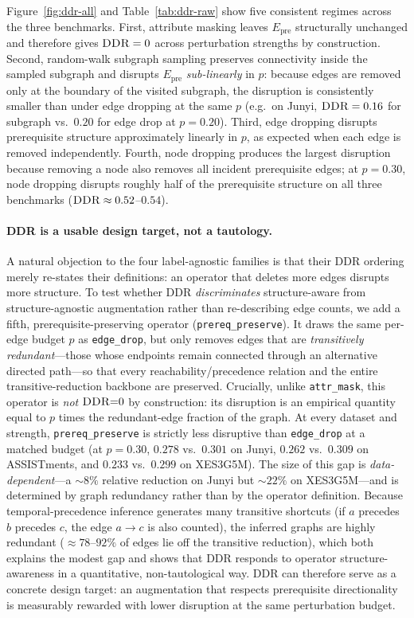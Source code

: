 \documentclass[runningheads]{llncs}
\newcommand{\Epre}{\ensuremath{E_{\text{pre}}}}
\newcommand{\DDR}{\textsc{DDR}}
\begin{document}
Figure~\ref{fig:ddr-all} and Table~\ref{tab:ddr-raw} show five
consistent regimes across the three benchmarks. First, attribute
masking leaves $\Epre$ structurally unchanged and therefore gives
$\DDR{}=0$ across perturbation strengths by construction. Second,
random-walk subgraph sampling preserves connectivity inside the
sampled subgraph and disrupts $\Epre$ \emph{sub-linearly} in $p$:
because edges are removed only at the boundary of the visited
subgraph, the disruption is consistently smaller than under
edge dropping at the same $p$ (e.g.\ on Junyi, $\DDR{} = 0.16$ for
subgraph vs.\ $0.20$ for edge drop at $p=0.20$). Third, edge dropping
disrupts prerequisite structure approximately linearly in $p$, as
expected when each edge is removed independently. Fourth, node
dropping produces the largest disruption because removing a node also
removes all incident prerequisite edges; at $p = 0.30$, node dropping
disrupts roughly half of the prerequisite structure on all three
benchmarks ($\DDR{} \approx 0.52$--$0.54$).

\paragraph{\DDR{} is a usable design target, not a tautology.}
A natural objection to the four label-agnostic families is that their
\DDR{} ordering merely re-states their definitions: an operator that
deletes more edges disrupts more structure. To test whether \DDR{}
\emph{discriminates} structure-aware from structure-agnostic
augmentation rather than re-describing edge counts, we add a fifth,
prerequisite-preserving operator (\texttt{prereq\_preserve}). It draws
the same per-edge budget $p$ as \texttt{edge\_drop}, but only removes
edges that are \emph{transitively redundant}---those whose endpoints
remain connected through an alternative directed path---so that every
reachability/precedence relation and the entire transitive-reduction
backbone are preserved. Crucially, unlike \texttt{attr\_mask}, this
operator is \emph{not} $\DDR{=}0$ by construction: its disruption is an
empirical quantity equal to $p$ times the redundant-edge fraction of the
graph. At every dataset and strength, \texttt{prereq\_preserve} is
strictly less disruptive than \texttt{edge\_drop} at a matched budget
(at $p=0.30$, $0.278$ vs.\ $0.301$ on Junyi, $0.262$ vs.\ $0.309$ on
ASSISTments, and $0.233$ vs.\ $0.299$ on XES3G5M). The size of this gap
is \emph{data-dependent}---a $\sim 8\%$ relative reduction on Junyi but
$\sim 22\%$ on XES3G5M---and is determined by graph redundancy rather
than by the operator definition. Because temporal-precedence inference
generates many transitive shortcuts (if $a$ precedes $b$ precedes $c$,
the edge $a\!\to\!c$ is also counted), the inferred graphs are
highly redundant ($\approx 78$--$92\%$ of edges lie off the transitive
reduction), which both explains the modest gap and shows that \DDR{}
responds to operator structure-awareness in a quantitative,
non-tautological way. \DDR{} can therefore serve as a concrete design
target: an augmentation that respects prerequisite directionality is
measurably rewarded with lower disruption at the same perturbation
budget.
\end{document}
